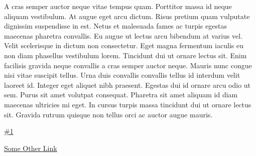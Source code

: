     { %
      A cras semper auctor neque vitae tempus quam. Porttitor massa id neque aliquam vestibulum. At augue eget arcu dictum. Risus pretium quam vulputate dignissim suspendisse in est. Netus et malesuada fames ac turpis egestas maecenas pharetra convallis. Eu augue ut lectus arcu bibendum at varius vel. Velit scelerisque in dictum non consectetur. Eget magna fermentum iaculis eu non diam phasellus vestibulum lorem. Tincidunt dui ut ornare lectus sit. Enim facilisis gravida neque convallis a cras semper auctor neque. Mauris nunc congue nisi vitae suscipit tellus. Urna duis convallis convallis tellus id interdum velit laoreet id. Integer eget aliquet nibh praesent. Egestas dui id ornare arcu odio ut sem. Purus sit amet volutpat consequat. Pharetra sit amet aliquam id diam maecenas ultricies mi eget. In cursus turpis massa tincidunt dui ut ornare lectus sit. Gravida rutrum quisque non tellus orci ac auctor augue mauris.
    }
    { %
    \item\href{github.com}{\#1}
    \item\href{github.com}{Some Other Link}
    }
